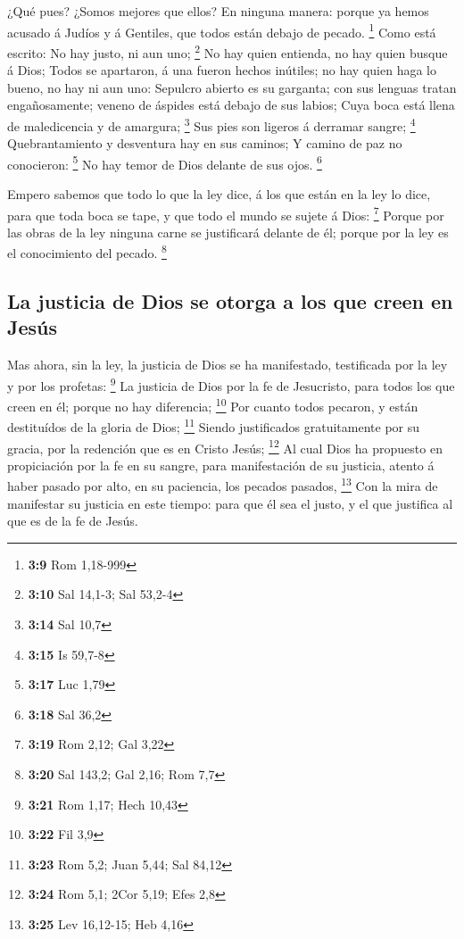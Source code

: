  ¿Qué pues? ¿Somos mejores que ellos? En ninguna manera:
porque ya hemos acusado á Judíos y á Gentiles, que todos están debajo de
pecado. \footnote{\textbf{3:9} Rom 1,18-999}  Como está
escrito: No hay justo, ni aun uno; \footnote{\textbf{3:10} Sal 14,1-3;
  Sal 53,2-4}  No hay quien entienda, no hay quien busque
á Dios;  Todos se apartaron, á una fueron hechos
inútiles; no hay quien haga lo bueno, no hay ni aun uno: 
Sepulcro abierto es su garganta; con sus lenguas tratan engañosamente;
veneno de áspides está debajo de sus labios;  Cuya boca
está llena de maledicencia y de amargura; \footnote{\textbf{3:14} Sal
  10,7}  Sus pies son ligeros á derramar sangre;
\footnote{\textbf{3:15} Is 59,7-8}  Quebrantamiento y
desventura hay en sus caminos;  Y camino de paz no
conocieron: \footnote{\textbf{3:17} Luc 1,79}  No hay
temor de Dios delante de sus ojos. \footnote{\textbf{3:18} Sal 36,2}

 Empero sabemos que todo lo que la ley dice, á los que
están en la ley lo dice, para que toda boca se tape, y que todo el mundo
se sujete á Dios: \footnote{\textbf{3:19} Rom 2,12; Gal 3,22}
 Porque por las obras de la ley ninguna carne se
justificará delante de él; porque por la ley es el conocimiento del
pecado. \footnote{\textbf{3:20} Sal 143,2; Gal 2,16; Rom 7,7}

\hypertarget{la-justicia-de-dios-se-otorga-a-los-que-creen-en-jesuxfas}{%
\subsection{La justicia de Dios se otorga a los que creen en
Jesús}\label{la-justicia-de-dios-se-otorga-a-los-que-creen-en-jesuxfas}}

 Mas ahora, sin la ley, la justicia de Dios se ha
manifestado, testificada por la ley y por los profetas: \footnote{\textbf{3:21}
  Rom 1,17; Hech 10,43}  La justicia de Dios por la fe de
Jesucristo, para todos los que creen en él; porque no hay diferencia;
\footnote{\textbf{3:22} Fil 3,9}  Por cuanto todos
pecaron, y están destituídos de la gloria de Dios; \footnote{\textbf{3:23}
  Rom 5,2; Juan 5,44; Sal 84,12}  Siendo justificados
gratuitamente por su gracia, por la redención que es en Cristo Jesús;
\footnote{\textbf{3:24} Rom 5,1; 2Cor 5,19; Efes 2,8}  Al
cual Dios ha propuesto en propiciación por la fe en su sangre, para
manifestación de su justicia, atento á haber pasado por alto, en su
paciencia, los pecados pasados, \footnote{\textbf{3:25} Lev 16,12-15;
  Heb 4,16}  Con la mira de manifestar su justicia en
este tiempo: para que él sea el justo, y el que justifica al que es de
la fe de Jesús.

